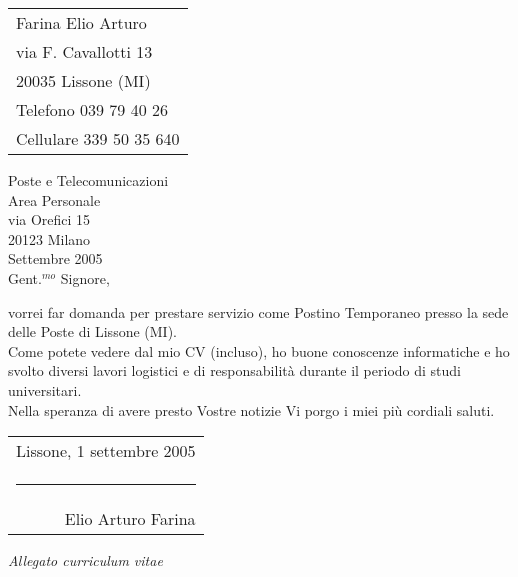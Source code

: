 \documentclass[12pt,a4paper]{article}
\begin{document}
\large

\begin{flushright}
\begin{tabular}{p{140pt}}
Farina Elio Arturo\\
via F. Cavallotti 13\\
20035 Lissone (MI)\\
Telefono 039 79 40 26\\
Cellulare 339 50 35 640\\
\end{tabular}
\end{flushright}


\noindent
Poste e Telecomunicazioni\\
Area Personale\\
via Orefici 15\\
20123 Milano\\

 Settembre 2005\\

\noindent
Gent.$^{mo}$  Signore,

vorrei far domanda per prestare servizio come Postino Temporaneo presso la sede delle Poste di Lissone (MI).\\

\noindent
Come potete vedere dal mio CV (incluso), ho buone conoscenze informatiche e ho svolto diversi lavori logistici e di responsabilit\`a durante il periodo di studi universitari.\\

\noindent
Nella speranza di avere presto Vostre notizie Vi porgo i miei pi\`u cordiali saluti.


\vfill
\begin{flushright}
\begin{tabular}{r}
Lissone, 1 settembre 2005\\[25pt]
\rule{250pt}{0.5pt}\\[-4pt]
\small{Elio Arturo Farina}
\end{tabular}
\end{flushright}


\vfill
\noindent
{\em Allegato curriculum vitae}
\end{document}
